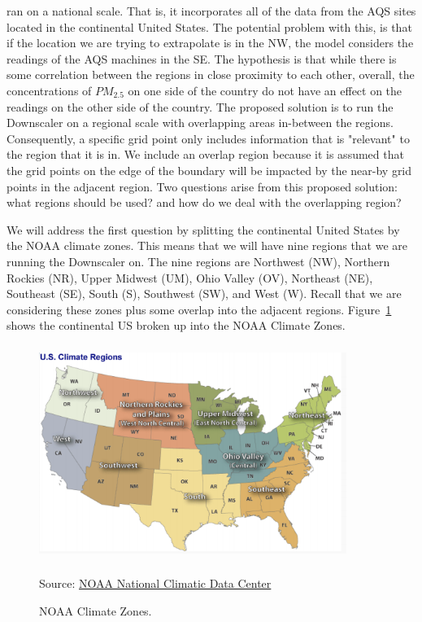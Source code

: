 \documentclass[10pt]{article}
\begin{document}
ran on a national scale.  That is, it incorporates all of the data from the AQS sites located in the continental United States.  The potential problem with this, is that if the location we are trying to extrapolate is in the NW, the model considers the readings of the AQS machines in the SE.  The hypothesis is that while there is some correlation between the regions in close proximity to each other, overall, the concentrations of $PM_{2.5}$ on one side of the country do not have an effect on the readings on the other side of the country.  The proposed solution is to run the Downscaler on a regional scale with overlapping areas in-between the regions.  Consequently, a specific grid point only includes information that is "relevant" to the region that it is in.  We include an overlap region because it is assumed that the grid points on the edge of the boundary will be impacted by the near-by grid points in the adjacent region.  Two questions arise from this proposed solution: what regions should be used? and how do we deal with the overlapping region?

\justify
We will address the first question by splitting the continental United States by the NOAA climate zones.  This means that we will have nine regions that we are running the Downscaler on.  The nine regions are Northwest (NW), Northern Rockies (NR), Upper Midwest (UM), Ohio Valley (OV), Northeast (NE), Southeast (SE), South (S), Southwest (SW), and West (W).  Recall that we are considering these zones plus some overlap into the adjacent regions. Figure~\ref{fig:US} shows the continental US broken up into the NOAA Climate Zones.

\begin{figure}
	\centering
	\vspace{-2em}
	\includegraphics[width= 10cm, scale = 1, height = 7cm]{ContUS}
	\caption{NOAA Climate Zones.}
	\begin{flushleft}
	Source: \href{https://www.epa.gov/sites/production/files/2016-05/us-climate-regions_0.gif}{NOAA National Climatic Data Center} 
	\end{flushleft}
	\label{fig:US}
\end{figure}
\end{document}
